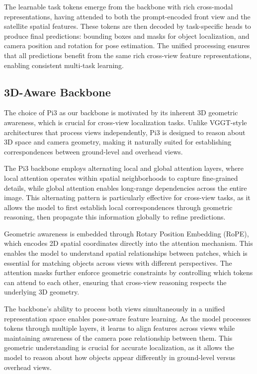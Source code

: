 The learnable task tokens emerge from the backbone with rich cross-modal representations, having attended to both the prompt-encoded front view and the satellite spatial features. These tokens are then decoded by task-specific heads to produce final predictions: bounding boxes and masks for object localization, and camera position and rotation for pose estimation. The unified processing ensures that all predictions benefit from the same rich cross-view feature representations, enabling consistent multi-task learning.

\subsection{3D-Aware Backbone}

The choice of Pi3 as our backbone is motivated by its inherent 3D geometric awareness, which is crucial for cross-view localization tasks. Unlike VGGT-style architectures that process views independently, Pi3 is designed to reason about 3D space and camera geometry, making it naturally suited for establishing correspondences between ground-level and overhead views.

The Pi3 backbone employs alternating local and global attention layers, where local attention operates within spatial neighborhoods to capture fine-grained details, while global attention enables long-range dependencies across the entire image. This alternating pattern is particularly effective for cross-view tasks, as it allows the model to first establish local correspondences through geometric reasoning, then propagate this information globally to refine predictions.

Geometric awareness is embedded through Rotary Position Embedding (RoPE), which encodes 2D spatial coordinates directly into the attention mechanism. This enables the model to understand spatial relationships between patches, which is essential for matching objects across views with different perspectives. The attention masks further enforce geometric constraints by controlling which tokens can attend to each other, ensuring that cross-view reasoning respects the underlying 3D geometry.

The backbone's ability to process both views simultaneously in a unified representation space enables pose-aware feature learning. As the model processes tokens through multiple layers, it learns to align features across views while maintaining awareness of the camera pose relationship between them. This geometric understanding is crucial for accurate localization, as it allows the model to reason about how objects appear differently in ground-level versus overhead views.

